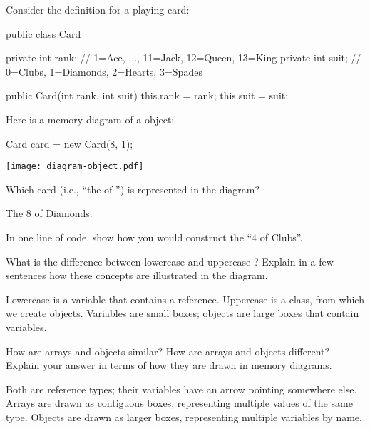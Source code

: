 
Consider the definition for a playing card:

\medskip
\begin{javalst}
public class Card {
    private int rank;  // 1=Ace, ..., 11=Jack, 12=Queen, 13=King
    private int suit;  // 0=Clubs, 1=Diamonds, 2=Hearts, 3=Spades

    public Card(int rank, int suit) {
        this.rank = rank;
        this.suit = suit;
    }
}
\end{javalst}

\bigskip
Here is a memory diagram of a  object:

\begin{javalst}
    Card card = new Card(8, 1);
\end{javalst}

\vspace{-6.8em}
\hfill \texttt{[image: diagram-object.pdf]}
\hspace{4em} \null
\vspace{0.5em}




\Q Which card (i.e., ``the \blank of \blank'') is represented in the diagram?

\begin{answer}[2em]
The 8 of Diamonds.
\end{answer}

\Q In one line of code, show how you would construct the ``4 of Clubs''.

\begin{answer}[2em]
\end{answer}


\Q What is the difference between lowercase  and uppercase ? Explain in a few sentences how these concepts are illustrated in the diagram.

\begin{answer}[5em]
Lowercase  is a variable that contains a reference.
Uppercase  is a class, from which we create objects.
Variables are small boxes; objects are large boxes that contain variables.
\end{answer}


\Q \label{key2}
How are arrays and objects similar? How are arrays and objects different?
Explain your answer in terms of how they are drawn in memory diagrams.

\begin{answer}[5em]
Both are reference types; their variables have an arrow pointing somewhere else.
Arrays are drawn as contiguous boxes, representing multiple values of the same type.
Objects are drawn as larger boxes, representing multiple variables by name.
\end{answer}


